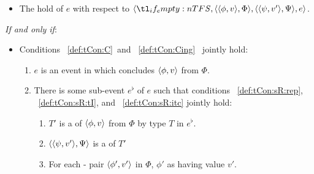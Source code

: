 \begin{note}
  \begin{definition}
    \label{def:tCon}
    \vspace{-\baselineskip}
    \begin{itemize}
    \item
      The \emph{} hold of \(e\) with respect to \(\langle \vAgent{}, \pvp{\phi}{v}{\Phi}, \pvp{\psi}{v'}{\Psi}, e \rangle\).
    \end{itemize}

    \emph{If and only if}:

    \begin{itemize}
    \item
      Conditions~%
      \ref{def:tCon:C}~and~%
      \ref{def:tCon:Cing}~%
      jointly hold:
      \begin{enumerate}[label=\arabic*., ref=(\arabic*)]
      \item
        \label{def:tCon:C}
        \(e\) is an event in which \vAgent{} concludes \(\langle \phi, v \rangle\) from \(\Phi\).
      \item
        \label{def:tCon:Cing}
        There is some sub-event \(e^{\flat}\) of \(e\) such that conditions%
          ~\ref{def:tCon:sR:rep},%
          ~\ref{def:tCon:sR:tI}, and%
          ~\ref{def:tCon:sR:itc} %
          jointly hold:
          \begin{enumerate}[label=\roman*., ref=(\arabic{enumi}\roman*)]
          \item
            \label{def:tCon:sR:rep}
            \(T'\) is a \tRep{} of \vAgent{} \tCV{} \(\langle \phi, v \rangle\) from \(\Phi\) by type \(T\) in \(e^{\flat}\).
          \item
            \label{def:tCon:sR:tI}
            \(\langle \langle \psi, v' \rangle, \Psi \rangle\) is a \tI{} of \(T'\)
          \item
            \label{def:tCon:sR:itc}
            {
              \color{red}
              For each - pair \(\langle \phi', v' \rangle\) in \(\Phi\), \vAgent{} \evals{} \(\phi'\) as having value \(v'\).
            }
        \end{enumerate}
      \end{enumerate}
    \end{itemize}
    \vspace{-1.5\baselineskip}
  \end{definition}
\end{note}


